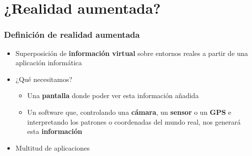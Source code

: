 \section{¿Realidad aumentada?}
\frame
{
\frametitle{Definición de realidad aumentada}
\begin{itemize}
  \item Superposición de \textbf{información virtual} sobre entornos reales a partir de una aplicación informática
  \item ¿Qué necesitamos?

  \begin{itemize}
    \item Una \textbf{pantalla} donde poder ver esta información añadida 
    \item Un software que, controlando una \textbf{cámara}, un \textbf{sensor} o un \textbf{GPS} e interpretando los patrones o coordenadas del mundo real, nos generará esta \textbf{información}
  \end{itemize}

  \item Multitud de aplicaciones
\end{itemize}
}